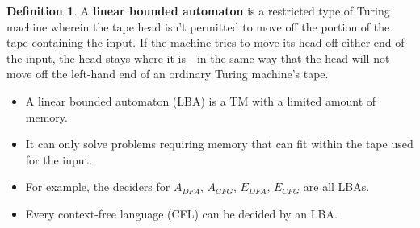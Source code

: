 \documentclass[11pt]{article}
\theoremstyle{definition}
\newtheorem{defn}{Definition}[section]
\begin{document}
\begin{defn}
A \textbf{linear bounded automaton} is a restricted type of Turing machine wherein the tape head isn't permitted to move off the portion of the tape containing the input. If the machine tries to move its head off either end of the input, the head stays where it is - in the same way that the head will not move off the left-hand end of an ordinary Turing machine's tape.
\end{defn}
\begin{itemize}[leftmargin=*]
    \item A linear bounded automaton (LBA) is a TM with a limited amount of memory. 
    \item It can only solve problems requiring memory that can fit within the tape used for the input.
    \item For example, the deciders for $A_{DFA}$, $A_{CFG}$, $E_{DFA}$, $E_{CFG}$ are all LBAs. 
    \item Every context-free language (CFL) can be decided by an LBA.
\end{itemize}
\end{document}
